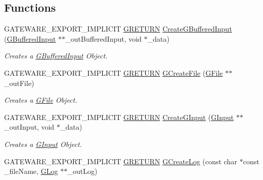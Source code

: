 \subsection*{Functions}
\begin{DoxyCompactItemize}
\item 
G\+A\+T\+E\+W\+A\+R\+E\+\_\+\+E\+X\+P\+O\+R\+T\+\_\+\+I\+M\+P\+L\+I\+C\+IT \hyperlink{namespace_g_w_a69b1aaebac1cac8049825f035884c95b}{G\+R\+E\+T\+U\+RN} \hyperlink{namespace_g_w_1_1_c_o_r_e_a004bf4f838aee645e39d1ce291866df4}{Create\+G\+Buffered\+Input} (\hyperlink{class_g_w_1_1_c_o_r_e_1_1_g_buffered_input}{G\+Buffered\+Input} $\ast$$\ast$\+\_\+out\+Buffered\+Input, void $\ast$\+\_\+data)
\begin{DoxyCompactList}\small\item\em Creates a \hyperlink{class_g_w_1_1_c_o_r_e_1_1_g_buffered_input}{G\+Buffered\+Input} Object. \end{DoxyCompactList}\item 
G\+A\+T\+E\+W\+A\+R\+E\+\_\+\+E\+X\+P\+O\+R\+T\+\_\+\+I\+M\+P\+L\+I\+C\+IT \hyperlink{namespace_g_w_a69b1aaebac1cac8049825f035884c95b}{G\+R\+E\+T\+U\+RN} \hyperlink{namespace_g_w_1_1_c_o_r_e_a0e56d3ae4b384ce268ed1cbdb9391ef1}{G\+Create\+File} (\hyperlink{class_g_w_1_1_c_o_r_e_1_1_g_file}{G\+File} $\ast$$\ast$\+\_\+out\+File)
\begin{DoxyCompactList}\small\item\em Creates a \hyperlink{class_g_w_1_1_c_o_r_e_1_1_g_file}{G\+File} Object. \end{DoxyCompactList}\item 
G\+A\+T\+E\+W\+A\+R\+E\+\_\+\+E\+X\+P\+O\+R\+T\+\_\+\+I\+M\+P\+L\+I\+C\+IT \hyperlink{namespace_g_w_a69b1aaebac1cac8049825f035884c95b}{G\+R\+E\+T\+U\+RN} \hyperlink{namespace_g_w_1_1_c_o_r_e_aec1bf5a7404f981ce2b33a35324d7f80}{Create\+G\+Input} (\hyperlink{class_g_w_1_1_c_o_r_e_1_1_g_input}{G\+Input} $\ast$$\ast$\+\_\+out\+Input, void $\ast$\+\_\+data)
\begin{DoxyCompactList}\small\item\em Creates a \hyperlink{class_g_w_1_1_c_o_r_e_1_1_g_input}{G\+Input} Object. \end{DoxyCompactList}\item 
G\+A\+T\+E\+W\+A\+R\+E\+\_\+\+E\+X\+P\+O\+R\+T\+\_\+\+I\+M\+P\+L\+I\+C\+IT \hyperlink{namespace_g_w_a69b1aaebac1cac8049825f035884c95b}{G\+R\+E\+T\+U\+RN} \hyperlink{namespace_g_w_1_1_c_o_r_e_a463db8a43954759bb7241fbd5b188ae2}{G\+Create\+Log} (const char $\ast$const \+\_\+file\+Name, \hyperlink{class_g_w_1_1_c_o_r_e_1_1_g_log}{G\+Log} $\ast$$\ast$\+\_\+out\+Log)

\end{DoxyCompactItemize}
